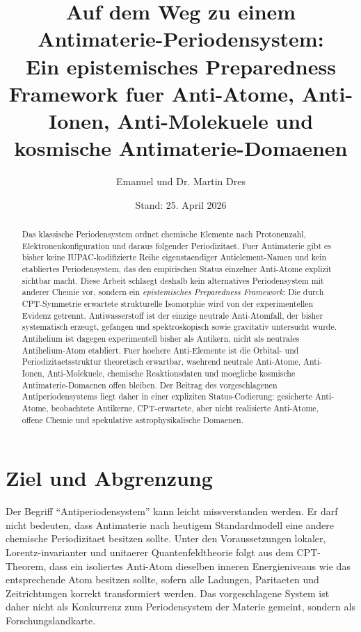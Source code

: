 \documentclass[11pt,a4paper]{article}
\title{Auf dem Weg zu einem Antimaterie-Periodensystem:\\
Ein epistemisches Preparedness Framework fuer Anti-Atome, Anti-Ionen, Anti-Molekuele und kosmische Antimaterie-Domaenen}
\author{Emanuel und Dr. Martin Dres}
\date{Stand: 25. April 2026}
\begin{document}
\maketitle

\begin{abstract}
Das klassische Periodensystem ordnet chemische Elemente nach Protonenzahl, Elektronenkonfiguration und daraus folgender Periodizitaet. Fuer Antimaterie gibt es bisher keine IUPAC-kodifizierte Reihe eigenstaendiger Antielement-Namen und kein etabliertes Periodensystem, das den empirischen Status einzelner Anti-Atome explizit sichtbar macht. Diese Arbeit schlaegt deshalb kein alternatives Periodensystem mit anderer Chemie vor, sondern ein \emph{epistemisches Preparedness Framework}: Die durch CPT-Symmetrie erwartete strukturelle Isomorphie wird von der experimentellen Evidenz getrennt. Antiwasserstoff ist der einzige neutrale Anti-Atomfall, der bisher systematisch erzeugt, gefangen und spektroskopisch sowie gravitativ untersucht wurde. Antihelium ist dagegen experimentell bisher als Antikern, nicht als neutrales Antihelium-Atom etabliert. Fuer hoehere Anti-Elemente ist die Orbital- und Periodizitaetsstruktur theoretisch erwartbar, waehrend neutrale Anti-Atome, Anti-Ionen, Anti-Molekuele, chemische Reaktionsdaten und moegliche kosmische Antimaterie-Domaenen offen bleiben. Der Beitrag des vorgeschlagenen Antiperiodensystems liegt daher in einer expliziten Status-Codierung: gesicherte Anti-Atome, beobachtete Antikerne, CPT-erwartete, aber nicht realisierte Anti-Atome, offene Chemie und spekulative astrophysikalische Domaenen.
\end{abstract}

\tableofcontents
\newpage

\section{Ziel und Abgrenzung}

Der Begriff \enquote{Antiperiodensystem} kann leicht missverstanden werden. Er darf nicht bedeuten, dass Antimaterie nach heutigem Standardmodell eine andere chemische Periodizitaet besitzen sollte. Unter den Voraussetzungen lokaler, Lorentz-invarianter und unitaerer Quantenfeldtheorie folgt aus dem CPT-Theorem, dass ein isoliertes Anti-Atom dieselben inneren Energieniveaus wie das entsprechende Atom besitzen sollte, sofern alle Ladungen, Paritaeten und Zeitrichtungen korrekt transformiert werden. Das vorgeschlagene System ist daher nicht als Konkurrenz zum Periodensystem der Materie gemeint, sondern als Forschungslandkarte.
\end{document}
